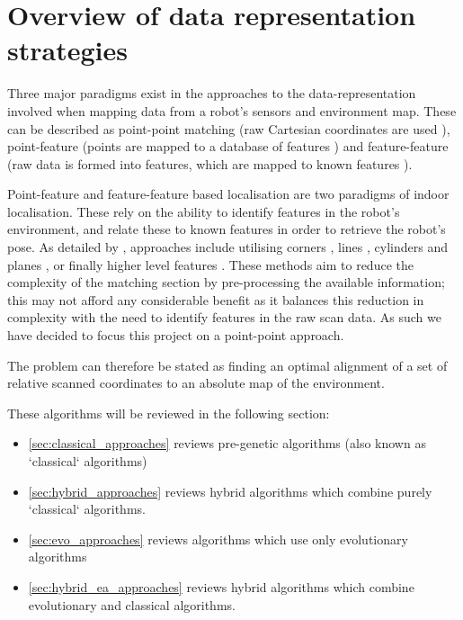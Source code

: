 \documentclass[authoryearcitations]{UoYCSproject}
\begin{document}
\section{Overview of data representation strategies}
Three major paradigms exist in the approaches to the data-representation involved when mapping data from a robot's sensors and environment map. These can be described as point-point matching (raw Cartesian coordinates are used \cite{Lu1997-zv}), point-feature (points are mapped to a database of features \cite{Censi2008-ik}) and feature-feature (raw data is formed into features, which are mapped to known features \cite{Reina2000-vq}). \newline

Point-feature and feature-feature based localisation are two paradigms of indoor localisation. These rely on the ability to identify features in the robot's environment, and relate these to known features in order to retrieve the robot's pose. As detailed by \citet{Filliat2003-ay}, approaches include utilising corners \cite{Borghi1995-pi} \cite{Hebert1996-rc}, lines \cite{Moutarlier1990-ld} \cite{Einsele1997-dl}, cylinders and planes \cite{Leonard1990-hx}, or finally higher level features \cite{Ayache1990-ok}. These methods aim to reduce the complexity of the matching section by pre-processing the available information; this may not afford any considerable benefit as it balances this reduction in complexity with the need to identify features in the raw scan data. As such we have decided to focus this project on a point-point approach. \newline

The problem can therefore be stated as finding an optimal alignment of a set of relative scanned coordinates to an absolute map of the environment. \newline

These algorithms will be reviewed in the following section:
\begin{itemize}
	\item \autoref{sec:classical_approaches} reviews pre-genetic algorithms (also known as `classical` algorithms)
	\item \autoref{sec:hybrid_approaches} reviews hybrid algorithms which combine purely `classical` algorithms.
	\item \autoref{sec:evo_approaches} reviews algorithms which use only evolutionary algorithms
	\item \autoref{sec:hybrid_ea_approaches} reviews hybrid algorithms which combine evolutionary and classical algorithms.
\end{itemize}
\end{document}

